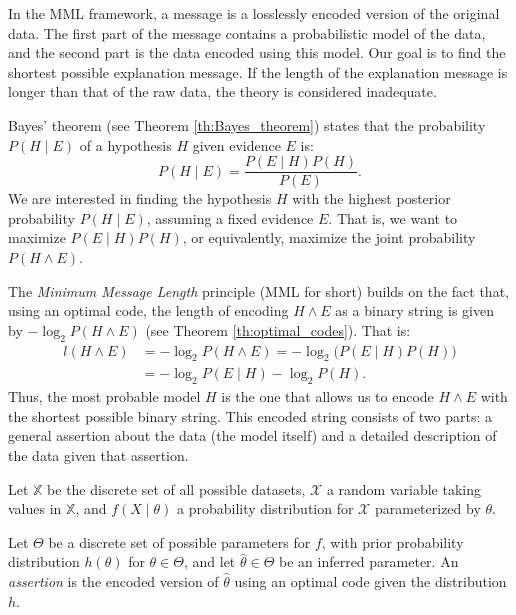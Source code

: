 In the MML framework, a message is a losslessly encoded version of the original data. The first part of the message contains a probabilistic model of the data, and the second part is the data encoded using this model. Our goal is to find the shortest possible explanation message. If the length of the explanation message is longer than that of the raw data, the theory is considered inadequate.

Bayes' theorem (see Theorem \ref{th:Bayes_theorem}) states that the probability $P(H \mid E)$ of a hypothesis $H$ given evidence $E$ is:
\[
    P(H \mid E) = \frac{ P( E \mid H ) P(H) }{ P(E) }.
\]
We are interested in finding the hypothesis $H$ with the highest posterior probability $P(H \mid E)$, assuming a fixed evidence $E$. That is, we want to maximize $P( E \mid H ) P(H)$, or equivalently, maximize the joint probability $P ( H \wedge E )$.

The \emph{Minimum Message Length} principle (MML for short) builds on the fact that, using an optimal code, the length of encoding $H \wedge E$ as a binary string is given by $- \log_2 P ( H \wedge E )$ (see Theorem \ref{th:optimal_codes}). That is:
\begin{equation*}
\begin{split}
l(H \wedge E) & = - \log_2 P ( H \wedge E ) = - \log_2 \big(P( E \mid H ) P(H)\big) \\
              & = - \log_2 P( E \mid H ) - \log_2 P(H).
\end{split}
\end{equation*}
Thus, the most probable model $H$ is the one that allows us to encode $H \wedge E$ with the shortest possible binary string. This encoded string consists of two parts: a general assertion about the data (the model itself) and a detailed description of the data given that assertion.

Let $\mathbb{X}$ be the discrete set of all possible datasets, $\mathcal{X}$ a random variable taking values in $\mathbb{X}$, and $f(X \mid \theta)$ a probability distribution for $\mathcal{X}$ parameterized by $\theta$.

\begin{definition}
Let $\Theta$ be a discrete set of possible parameters for $f$, with prior probability distribution $h(\theta)$ for $\theta \in \Theta$, and let $\hat\theta \in \Theta$ be an inferred parameter. An \emph{assertion} is the encoded version of $\hat\theta$ using an optimal code given the distribution $h$.
\end{definition}

